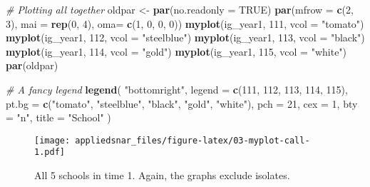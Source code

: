 \documentclass[]{book}
\newenvironment{Shaded}{\begin{snugshade}}{\end{snugshade}}
\newcommand{\KeywordTok}[1]{\textcolor[rgb]{0.13,0.29,0.53}{\textbf{#1}}}
\newcommand{\DataTypeTok}[1]{\textcolor[rgb]{0.13,0.29,0.53}{#1}}
\newcommand{\DecValTok}[1]{\textcolor[rgb]{0.00,0.00,0.81}{#1}}
\newcommand{\StringTok}[1]{\textcolor[rgb]{0.31,0.60,0.02}{#1}}
\newcommand{\CommentTok}[1]{\textcolor[rgb]{0.56,0.35,0.01}{\textit{#1}}}
\newcommand{\OtherTok}[1]{\textcolor[rgb]{0.56,0.35,0.01}{#1}}
\newcommand{\NormalTok}[1]{#1}
\theoremstyle{definition}
\theoremstyle{definition}
\theoremstyle{definition}
\theoremstyle{remark}
\begin{document}
\begin{Shaded}
\begin{Highlighting}[]
\CommentTok{# Plotting all together}
\NormalTok{oldpar <-}\StringTok{ }\KeywordTok{par}\NormalTok{(}\DataTypeTok{no.readonly =} \OtherTok{TRUE}\NormalTok{)}
\KeywordTok{par}\NormalTok{(}\DataTypeTok{mfrow =} \KeywordTok{c}\NormalTok{(}\DecValTok{2}\NormalTok{, }\DecValTok{3}\NormalTok{), }\DataTypeTok{mai =} \KeywordTok{rep}\NormalTok{(}\DecValTok{0}\NormalTok{, }\DecValTok{4}\NormalTok{), }\DataTypeTok{oma=} \KeywordTok{c}\NormalTok{(}\DecValTok{1}\NormalTok{, }\DecValTok{0}\NormalTok{, }\DecValTok{0}\NormalTok{, }\DecValTok{0}\NormalTok{))}
\KeywordTok{myplot}\NormalTok{(ig_year1, }\DecValTok{111}\NormalTok{, }\DataTypeTok{vcol =} \StringTok{"tomato"}\NormalTok{)}
\KeywordTok{myplot}\NormalTok{(ig_year1, }\DecValTok{112}\NormalTok{, }\DataTypeTok{vcol =} \StringTok{"steelblue"}\NormalTok{)}
\KeywordTok{myplot}\NormalTok{(ig_year1, }\DecValTok{113}\NormalTok{, }\DataTypeTok{vcol =} \StringTok{"black"}\NormalTok{)}
\KeywordTok{myplot}\NormalTok{(ig_year1, }\DecValTok{114}\NormalTok{, }\DataTypeTok{vcol =} \StringTok{"gold"}\NormalTok{)}
\KeywordTok{myplot}\NormalTok{(ig_year1, }\DecValTok{115}\NormalTok{, }\DataTypeTok{vcol =} \StringTok{"white"}\NormalTok{)}
\KeywordTok{par}\NormalTok{(oldpar)}

\CommentTok{# A fancy legend}
\KeywordTok{legend}\NormalTok{(}
  \StringTok{"bottomright"}\NormalTok{,}
  \DataTypeTok{legend =} \KeywordTok{c}\NormalTok{(}\DecValTok{111}\NormalTok{, }\DecValTok{112}\NormalTok{, }\DecValTok{113}\NormalTok{, }\DecValTok{114}\NormalTok{, }\DecValTok{115}\NormalTok{),}
  \DataTypeTok{pt.bg  =} \KeywordTok{c}\NormalTok{(}\StringTok{"tomato"}\NormalTok{, }\StringTok{"steelblue"}\NormalTok{, }\StringTok{"black"}\NormalTok{, }\StringTok{"gold"}\NormalTok{, }\StringTok{"white"}\NormalTok{),}
  \DataTypeTok{pch    =} \DecValTok{21}\NormalTok{,}
  \DataTypeTok{cex    =} \DecValTok{1}\NormalTok{,}
  \DataTypeTok{bty    =} \StringTok{"n"}\NormalTok{,}
  \DataTypeTok{title  =} \StringTok{"School"}
\NormalTok{  )}
\end{Highlighting}
\end{Shaded}

\begin{figure}
\centering
\texttt{[image: appliedsnar\_files/figure-latex/03-myplot-call-1.pdf]}
\caption{\label{fig:03-myplot-call}All 5 schools in time 1. Again, the
graphs exclude isolates.}
\end{figure}
\end{document}

